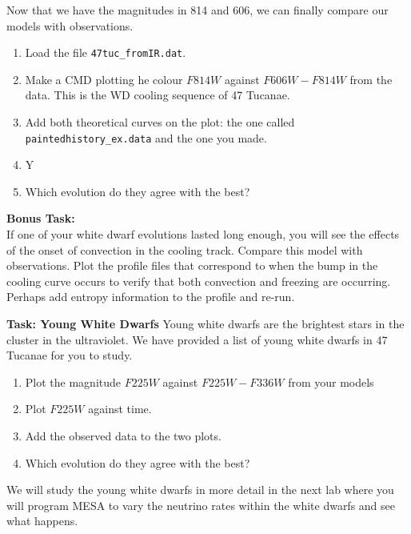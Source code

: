 \documentclass{article}
\begin{document}
Now that we have the magnitudes in 814 and 606, we can finally compare our models with observations.
\begin{enumerate}
\item Load the file \texttt{47tuc\_fromIR.dat}.
\item Make a CMD plotting he colour $F814W$ against $F606W-F814W$ from the data. This is the WD cooling sequence of 47 Tucanae.
\item Add both theoretical curves on the plot: the one called \texttt{paintedhistory\_ex.data} and the one you made.
\item Y
\item Which evolution do they agree with the best?
\end{enumerate}

\textbf{Bonus Task:}\\
If one of your white dwarf evolutions lasted long enough, you will see the effects of the onset of convection in the cooling track.  Compare this model with observations.   Plot the profile files that correspond to when the bump in the cooling curve occurs to verify that both convection and freezing are occurring.   Perhaps add entropy information to the profile and re-run. 


\textbf{Task: Young White Dwarfs}
Young white dwarfs are the brightest stars in the cluster in the ultraviolet.  We have provided a list of young white dwarfs in 47 Tucanae for you to study.
\begin{enumerate}
 \setlength\itemsep{0em}
\item Plot the magnitude $F225W$ against $F225W-F336W$ from your models
\item Plot $F225W$ against time.
\item Add the observed  data to the two plots.  
\item Which evolution do they agree with the best?
\end{enumerate}


We will study the young white dwarfs in more detail in the next lab where you will program MESA to vary the neutrino rates within the white dwarfs and see what happens.
\end{document}
